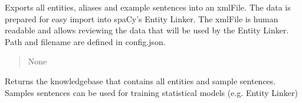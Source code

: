 \documentclass[letterpaper,10pt,english]{sphinxmanual}
\begin{document}
\begin{fulllineitems}
\begin{fulllineitems}
\label{\detokenize{medextractor.knowledge:medextractor.knowledge.knowledge_extractor.KnowledgeExtractor.export_for_entity_linker}}
\pysigstartsignatures
{}
\pysigstopsignatures
\sphinxAtStartPar
Exports all entities, aliases and example sentences into an xml\sphinxhyphen{}File. The data
is prepared for easy import into spaCy’s Entity Linker. The xml\sphinxhyphen{}File is human
readable and allows reviewing the data that will be used by the Entity Linker.
Path and filename are defined in config.json.
\begin{quote}\begin{description}
\sphinxAtStartPar
{} \textendash{} 

\sphinxAtStartPar
None

\end{description}\end{quote}

\end{fulllineitems}


\begin{fulllineitems}
\label{\detokenize{medextractor.knowledge:medextractor.knowledge.knowledge_extractor.KnowledgeExtractor.get_knowledge_base}}
\pysigstartsignatures
{}
\pysigstopsignatures
\sphinxAtStartPar
Returns the knowledgebase that contains all entities and
sample sentences. Samples sentences can be used for training
statistical models (e.g. Entity Linker)
\begin{quote}\begin{description}
\sphinxAtStartPar
{} \textendash{} 

\sphinxAtStartPar
{\hyperref[\detokenize{medextractor.knowledge:medextractor.knowledge.base.KnowledgeBase}]{}}

\end{description}\end{quote}


\end{fulllineitems}
\end{fulllineitems}
\end{document}

